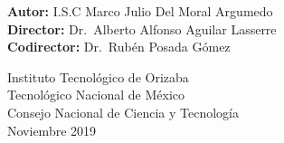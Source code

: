 \begin{titlepage}
\begin{center}
        \vspace*{0.7cm}
        \textbf{Autor:} I.S.C Marco Julio Del Moral Argumedo \\
        \textbf{Director:} Dr.\ Alberto Alfonso Aguilar Lasserre \\
        \textbf{Codirector:} Dr.\ Rubén Posada Gómez
        \vspace*{0.7cm}
        
        \large
        Instituto Tecnológico de Orizaba\\
        Tecnológico Nacional de México\\
        Consejo Nacional de Ciencia y Tecnología\\
        \normalsize
        Noviembre 2019
        
    \end{center}
\end{titlepage}